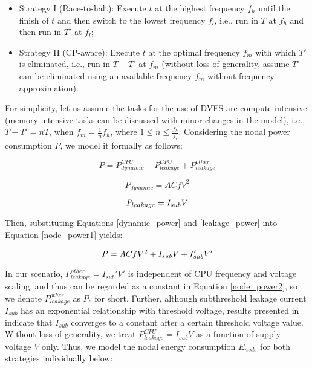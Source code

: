 \documentclass[12pt]{elsarticle}
\begin{document}
\begin{itemize}
\item \textsf{Strategy I (Race-to-halt)}: Execute $t$ at the highest frequency $f_h$ until the finish of $t$ and then switch to the lowest frequency $f_l$, i.e., run in $T$ at $f_h$ and then run in $T'$ at $f_l$;\item \textsf{Strategy II (CP-aware)}: Execute $t$ at the optimal frequency $f_m$ with which $T'$ is eliminated, i.e., run in $T + T'$ at $f_m$ (without loss of generality, assume $T'$ can be eliminated using an available frequency $f_m$ without frequency approximation).\end{itemize}

For simplicity, let us assume the tasks for the use of DVFS are compute-intensive (memory-intensive tasks can be discussed with minor changes in the model), i.e., $T + T' = nT$, when $f_m = \frac{1}{n}f_h$, where $1 \leq n \leq \frac{f_h}{f_l}$. Considering the nodal power consumption $P$, we model it formally as follows:

\vspace{-3mm}
\begin{equation}
\label{node_power1}
P = P_{dynamic}^{CPU} + P_{leakage}^{CPU} + P_{leakage}^{other}
\end{equation}

\vspace{-5.5mm}
\begin{equation}
\label{dynamic_power}
P_{dynamic} = ACfV^2\end{equation}

\vspace{-5.5mm}
\begin{equation}
\label{leakage_power}
P_{leakage} = I_{sub}V\vspace{0mm}
\end{equation}

Then, substituting Equations \ref{dynamic_power} and \ref{leakage_power} into Equation \ref{node_power1} yields:

\vspace{-3mm}
\begin{equation}
\label{node_power2}
P = ACfV^2 + I_{sub}V + I_{sub}'V'\vspace{0mm}
\end{equation}

In our scenario, $P_{leakage}^{other} = I_{sub}'V'$ is independent of CPU frequency and voltage scaling, and thus can be regarded as a constant in Equation \ref{node_power2}, so we denote $P_{leakage}^{other}$ as $P_c$ for short. Further, although subthreshold leakage current $I_{sub}$ has an exponential relationship with threshold voltage, results presented in \cite{edl04} indicate that $I_{sub}$ converges to a constant after a certain threshold voltage value. Without loss of generality, we treat $P_{leakage}^{CPU} = I_{sub}V$ as a function of supply voltage $V$ only. Thus, we model the nodal energy consumption $E_{node}$ for both strategies individually below:
\end{document}
